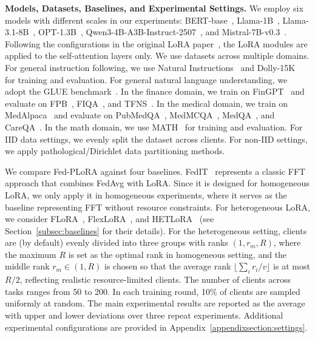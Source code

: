 \documentclass{article} %
\begin{document}
\textbf{Models, Datasets, Baselines, and Experimental Settings.}
We employ {six} models with different scales in our experiments: BERT-base~\cite{devlin2019bert}, Llama-1B~\cite{chen2024data}, Llama-3.1-8B~\cite{meta2024llama31}, OPT-1.3B~\cite{zhang2022opt}, {Qwen3-4B-A3B-Instruct-2507~\cite{qwen3technicalreport}}, and Mistral-7B-v0.3~\cite{mistral7b2023}. Following the configurations in the original LoRA paper~\cite{hu2021lora}, the LoRA modules are applied to the self-attention layers only. 
% 
We use datasets across multiple domains. For general instruction following, we use Natural Instructions~\cite{wang2022super} and Dolly-15K~\cite{conover2023free} for training and evaluation. For general natural language understanding, we adopt the GLUE benchmark~\cite{wang2018glue}.  In the finance domain, we train on FinGPT~\cite{fingpt2023dataset} and evaluate on FPB~\cite{malo2014good}, FIQA~\cite{maia201818}, and TFNS~\cite{twitter_financial_news_2022}. In the medical domain, we train on MedAlpaca~\cite{han2023medalpaca} and evaluate on PubMedQA~\cite{jin2019pubmedqa}, MedMCQA~\cite{pal2022medmcqa}, MedQA~\cite{jin2021disease}, and CareQA~\cite{arias2025automatic}. {In the math domain, we use MATH~\cite{hendrycksmath2021} for training and evaluation.} For IID data settings, we evenly split the dataset across clients. For non-IID settings, we apply pathological/Dirichlet data partitioning methods. 

We compare Fed-PLoRA against four baselines. FedIT~\cite{zhang2023towards} represents a classic FFT approach that combines FedAvg with LoRA. Since it is designed for homogeneous LoRA, we only apply it in homogeneous experiments, where it serves as the baseline representing FFT without resource constraints. For heterogeneous LoRA, we consider FLoRA~\cite{wangflora}, FlexLoRA~\cite{bai2024federated}, and HETLoRA~\cite{cho2024heterogeneous} (see Section~\ref{subsec:baselines} for their details). For the heterogeneous setting, clients are (by default) evenly divided into three groups with ranks $(1, r_m, R)$, where the maximum $R$ is set as the optimal rank in homogeneous setting, and the middle rank $r_m \in (1, R)$ is chosen so that the average rank $\lfloor \sum_i r_i /v \rfloor$ is at most $R/2$, reflecting realistic resource-limited clients. 
% 
The number of clients across tasks ranges from 50 to 200. In each training round, 10\% of clients are sampled uniformly at random. The main experimental results are reported as the average with upper and lower deviations over three repeat experiments. Additional experimental configurations are provided in Appendix~\ref{appendixsection:settings}. 
\end{document}
